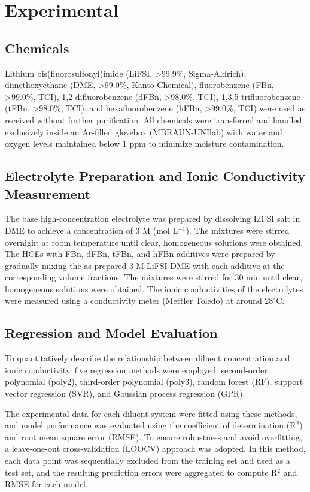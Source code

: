 \documentclass[11pt, a4paper]{article}
\begin{document}
\section{Experimental}

\subsection{Chemicals}

Lithium bis(fluorosulfonyl)imide (LiFSI, >99.9\%, Sigma-Aldrich), dimethoxyethane (DME, >99.0\%, Kanto Chemical), fluorobenzene (FBn, >99.0\%, TCI), 1,2-difluorobenzene (dFBn, >98.0\%, TCI), 1,3,5-trifluorobenzene (tFBn, >98.0\%, TCI), and hexafluorobenzene (hFBn, >99.0\%, TCI) were used as received without further purification. All chemicals were transferred and handled exclusively inside an Ar-filled glovebox (MBRAUN-UNIlab) with water and oxygen levels maintained below 1 ppm to minimize moisture contamination.

\subsection{Electrolyte Preparation and Ionic Conductivity Measurement}

The base high-concentration electrolyte was prepared by dissolving LiFSI salt in DME to achieve a concentration of 3 M (mol L$^{-1}$). The mixtures were stirred overnight at room temperature until clear, homogeneous solutions were obtained. The HCEs with FBn, dFBn, tFBn, and hFBn additives were prepared by gradually mixing the as-prepared 3 M LiFSI-DME with each additive at the corresponding volume fractions. The mixtures were stirred for 30 min until clear, homogeneous solutions were obtained. The ionic conductivities of the electrolytes were measured using a conductivity meter (Mettler Toledo) at around 28$^\circ$C.

\subsection{Regression and Model Evaluation}

To quantitatively describe the relationship between diluent concentration and ionic conductivity, five regression methods were employed: second-order polynomial (poly2), third-order polynomial (poly3), random forest (RF), support vector regression (SVR), and Gaussian process regression (GPR).

The experimental data for each diluent system were fitted using these methods, and model performance was evaluated using the coefficient of determination (R$^2$) and root mean square error (RMSE). To ensure robustness and avoid overfitting, a leave-one-out cross-validation (LOOCV) approach was adopted. In this method, each data point was sequentially excluded from the training set and used as a test set, and the resulting prediction errors were aggregated to compute R$^2$ and RMSE for each model.
\end{document}
